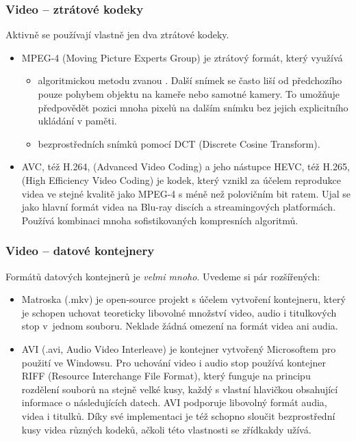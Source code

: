 \documentclass[aspectratio=169,11pt,svgnames]{beamer}
\begin{document}
\begin{frame}
 \frametitle{Video -- ztrátové kodeky}
 Aktivně se používají vlastně jen dva ztrátové kodeky.
 \begin{itemize}[label=\textbullet]
  \item \alert{MPEG-4} (Moving Picture Experts Group) je ztrátový formát, který
   využívá
  \begin{itemize}[label=\textemdash]
   \item algoritmickou metodu zvanou . Další snímek se
    často liší od předchozího pouze pohybem objektu na kameře nebo samotné
    kamery. To umožňuje předpovědět pozici mnoha pixelů na dalším snímku bez
    jejich explicitního ukládání v paměti.
   \pause
   \item {} bezprostředních snímků pomocí DCT (Discrete Cosine
    Transform).
  \end{itemize}
 \item \alert{AVC, též H.264}, (Advanced Video Coding) a jeho nástupce
  \alert{HEVC, též H.265}, (High Efficiency Video Coding) je kodek, který vznikl
  za účelem reprodukce videa ve stejné kvalitě jako MPEG-4 s méně než polovičním
  bit ratem. Ujal se jako hlavní formát videa na Blu-ray discích a
  streamingových platformách. Používá kombinaci mnoha sofistikovaných
  kompresních algoritmů.
 \end{itemize}
\end{frame}

\begin{frame}
 \frametitle{Video -- datové kontejnery}
 Formátů datových kontejnerů je \emph{velmi mnoho}. Uvedeme si pár rozšířených:
 \begin{itemize}[label=\textbullet]
  \item \alert{Matroska} (.mkv) je open-source projekt s účelem vytvoření
   kontejneru, který je schopen uchovat teoreticky libovolné množství video,
   audio i titulkových stop v~jednom souboru. Neklade žádná omezení na formát
   videa ani audia.
  \pause
  \item \alert{AVI} (.avi, Audio Video Interleave) je kontejner vytvořený
   Microsoftem pro použití ve Windowsu. Pro uchování video i audio stop používá
   kontejner \alert{RIFF} (Resource Interchange File Format), který funguje na
   principu rozdělení souborů na stejně velké kusy, každý s vlastní hlavičkou
   obsahující informace o následujících datech. AVI podporuje libovolný formát
   audia, videa i titulků. Díky své implementaci je též schopno sloučit
   bezprostřední kusy videa různých kodeků, ačkoli této vlastnosti se zřídkakdy
   užívá.
 \end{itemize}
\end{frame}
\end{document}
